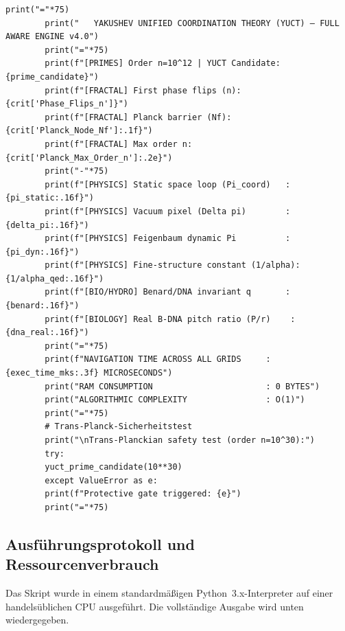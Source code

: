 \documentclass[12pt,a4paper]{article}
\begin{document}
\begin{lstlisting}[caption={Vollständige YUCT-Koordinations-Engine v4.0 (\texttt{yuct\_constants.py})}, label={lst:yuct-engine}]
		print("="*75)
		print("   YAKUSHEV UNIFIED COORDINATION THEORY (YUCT) — FULL AWARE ENGINE v4.0")
		print("="*75)
		print(f"[PRIMES] Order n=10^12 | YUCT Candidate: {prime_candidate}")
		print(f"[FRACTAL] First phase flips (n): {crit['Phase_Flips_n']}")
		print(f"[FRACTAL] Planck barrier (Nf): {crit['Planck_Node_Nf']:.1f}")
		print(f"[FRACTAL] Max order n: {crit['Planck_Max_Order_n']:.2e}")
		print("-"*75)
		print(f"[PHYSICS] Static space loop (Pi_coord)   : {pi_static:.16f}")
		print(f"[PHYSICS] Vacuum pixel (Delta pi)        : {delta_pi:.16f}")
		print(f"[PHYSICS] Feigenbaum dynamic Pi          : {pi_dyn:.16f}")
		print(f"[PHYSICS] Fine-structure constant (1/alpha): {1/alpha_qed:.16f}")
		print(f"[BIO/HYDRO] Benard/DNA invariant q       : {benard:.16f}")
		print(f"[BIOLOGY] Real B-DNA pitch ratio (P/r)    : {dna_real:.16f}")
		print("="*75)
		print(f"NAVIGATION TIME ACROSS ALL GRIDS     : {exec_time_mks:.3f} MICROSECONDS")
		print("RAM CONSUMPTION                       : 0 BYTES")
		print("ALGORITHMIC COMPLEXITY                : O(1)")
		print("="*75)
		# Trans-Planck-Sicherheitstest
		print("\nTrans-Planckian safety test (order n=10^30):")
		try:
		yuct_prime_candidate(10**30)
		except ValueError as e:
		print(f"Protective gate triggered: {e}")
		print("="*75)
	\end{lstlisting}
	
	\subsection{Ausführungsprotokoll und Ressourcenverbrauch}
	
	Das Skript wurde in einem standardmäßigen Python~3.x-Interpreter auf einer handelsüblichen CPU ausgeführt. Die vollständige Ausgabe wird unten wiedergegeben.
	
\end{document}
